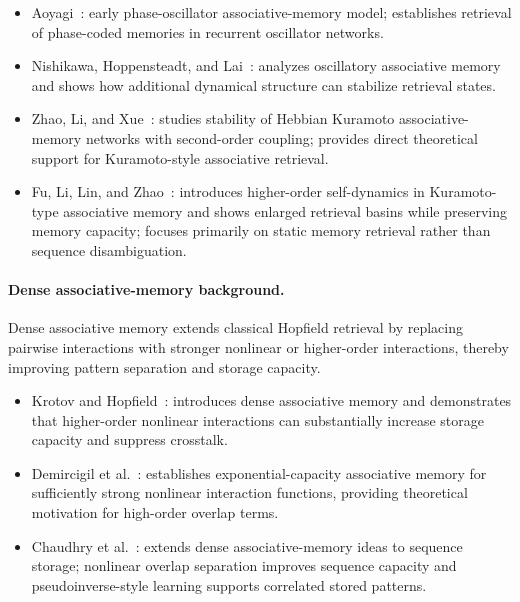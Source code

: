 \documentclass[11pt]{article}
\begin{document}
\begin{itemize}
\item Aoyagi~\cite{aoyagi1995}: early phase-oscillator associative-memory model; establishes retrieval of phase-coded memories in recurrent oscillator networks.

\item Nishikawa, Hoppensteadt, and Lai~\cite{nishikawa2004}: analyzes oscillatory associative memory and shows how additional dynamical structure can stabilize retrieval states.
\item Zhao, Li, and Xue~\cite{zhao2020}: studies stability of Hebbian Kuramoto associative-memory networks with second-order coupling; provides direct theoretical support for Kuramoto-style associative retrieval.
\item Fu, Li, Lin, and Zhao~\cite{fu2025}: introduces higher-order self-dynamics in Kuramoto-type associative memory and shows enlarged retrieval basins while preserving memory capacity; focuses primarily on static memory retrieval rather than sequence disambiguation.

\end{itemize}

\paragraph{Dense associative-memory background.}
Dense associative memory extends classical Hopfield retrieval by replacing pairwise interactions with stronger nonlinear or higher-order interactions, thereby improving pattern separation and storage capacity.

\begin{itemize}
\item Krotov and Hopfield~\cite{krotov2016dense}: introduces dense associative memory and demonstrates that higher-order nonlinear interactions can substantially increase storage capacity and suppress crosstalk.

\item Demircigil et al.~\cite{demircigil2017}: establishes exponential-capacity associative memory for sufficiently strong nonlinear interaction functions, providing theoretical motivation for high-order overlap terms.
\item Chaudhry et al.~\cite{chaudhry2024long}: extends dense associative-memory ideas to sequence storage; nonlinear overlap separation improves sequence capacity and pseudoinverse-style learning supports correlated stored patterns.

\end{itemize}
\end{document}
